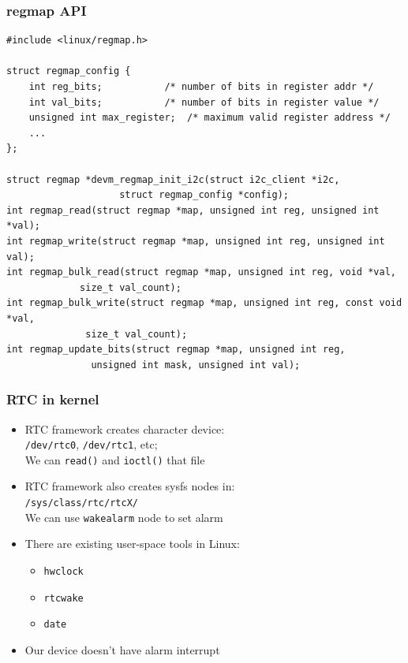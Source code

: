 \documentclass[aspectratio=169,usenames,dvipsnames]{beamer}
\newcounter{cont}
\begin{document}
\begin{frame}[containsverbatim]
  \frametitle{regmap API}
  \begin{lstlisting}[style=c]
#include <linux/regmap.h>

struct regmap_config {
	int reg_bits;			/* number of bits in register addr */
	int val_bits;			/* number of bits in register value */
	unsigned int max_register;	/* maximum valid register address */
	...
};

struct regmap *devm_regmap_init_i2c(struct i2c_client *i2c,
				    struct regmap_config *config);
int regmap_read(struct regmap *map, unsigned int reg, unsigned int *val);
int regmap_write(struct regmap *map, unsigned int reg, unsigned int val);
int regmap_bulk_read(struct regmap *map, unsigned int reg, void *val,
		     size_t val_count);
int regmap_bulk_write(struct regmap *map, unsigned int reg, const void *val,
		      size_t val_count);
int regmap_update_bits(struct regmap *map, unsigned int reg,
		       unsigned int mask, unsigned int val);
  \end{lstlisting}
\end{frame}

\begin{frame}
  \frametitle{RTC in kernel}
  \begin{itemize}
    \item RTC framework creates character device: \\
          \texttt{/dev/rtc0}, \texttt{/dev/rtc1}, etc; \\
          We can \texttt{read()} and \texttt{ioctl()} that file
    \item RTC framework also creates sysfs nodes in: \\
          \texttt{/sys/class/rtc/rtcX/} \\
          We can use \texttt{wakealarm} node to set alarm
    \item There are existing user-space tools in Linux:
      \begin{itemize}
        \item \texttt{hwclock}
        \item \texttt{rtcwake}
        \item \texttt{date}
      \end{itemize}
    \item Our device doesn't have alarm interrupt
  \end{itemize}
\end{frame}
\end{document}
